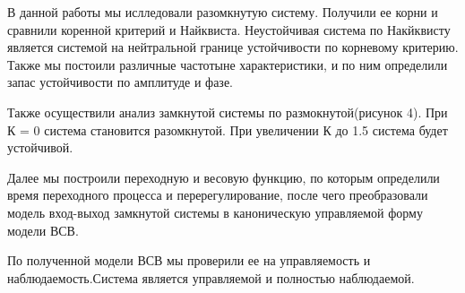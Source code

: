 \documentclass[a4paper, 12pt]{article}
\begin{document}
В данной работы мы ислледовали разомкнутую систему. Получили ее корни и сравнили коренной критерий и Найквиста. Неустойчивая система по Накйквисту является системой на нейтральной границе устойчивости по корневому критерию. Также мы постоили различные частотыне характеристики, и по ним определили запас устойчивости по амплитуде и фазе. \par
Также осуществили анализ замкнутой системы по размокнутой(рисунок 4). При К = 0 система становится разомкнутой. При увеличении К до 1.5 система будет устойчивой. \par
Далее мы построили переходную и весовую функцию, по которым определили время переходного процесса и перерегулирование, после чего преобразовали модель вход-выход замкнутой системы в каноническую управляемой форму модели ВСВ. \par
По полученной модели ВСВ мы проверили ее на управляемость и наблюдаемость.Система является управляемой и полностью наблюдаемой.
\end{document}
